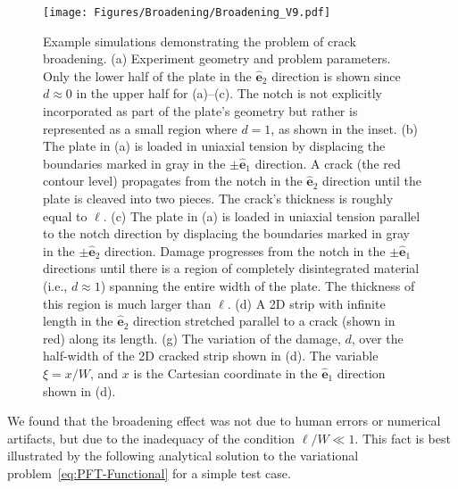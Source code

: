 \documentclass[10pt,letterpaper]{article}
\begin{document}
    \begin{figure}[t!]
      \centering
        \texttt{[image: Figures/Broadening/Broadening\_V9.pdf]}
          \caption{ \footnotesize Example simulations demonstrating the problem of crack broadening. (a) Experiment geometry and problem parameters. Only the lower half of the plate in the $\hat{\mathbf{e}}_2$ direction is shown since $d\approx 0$ in the upper half for (a)--(c). The notch is not explicitly incorporated as part of the plate's geometry but rather is represented as a small region where $d=1$, as shown in the inset. (b) The plate in (a) is loaded in uniaxial tension by displacing the boundaries marked in gray in the $\pm \hat{\mathbf{e}}_1$ direction. A crack (the red contour level) propagates from the notch in the $\hat{\mathbf{e}}_2$ direction until the plate is cleaved into two pieces. The crack's thickness is roughly equal to $\ell$. (c) The plate in (a) is loaded in uniaxial tension parallel to the notch direction by displacing the boundaries marked in gray in the $\pm \hat{\mathbf{e}}_2$ direction. Damage progresses from the notch in the $\pm \hat{\mathbf{e}}_1$ directions until there is a region of completely disintegrated material (i.e., $d\approx1$) spanning the entire width of the plate. The thickness of this region is much larger than $\ell$. (d) A 2D strip with infinite length in the $\hat{\mathbf{e}}_2$ direction stretched parallel to a crack (shown in red) along its length. (g) The variation of the damage, $d$, over the half-width of the 2D cracked strip shown in (d). The variable $\xi=x/W$, and $x$ is the Cartesian coordinate in the  $\hat{\mathbf{e}}_1$ direction shown in (d).
      }
      \label{f:broadening}
    \end{figure}

    We found that the broadening effect was not due to human errors or numerical artifacts, but due to the inadequacy of the condition $\ell/W \ll 1$. This  fact is best illustrated by the following analytical solution to the variational problem~\eqref{eq:PFT-Functional} for a simple test case. %
\end{document}
